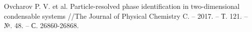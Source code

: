 \documentclass[pdf,hyperref={unicode}]{beamer}
\begin{document}
\begin{frame}
\begin{columns}
\begin{column}{0.4\linewidth}
{
\begin{figure}[h]
\end{figure}
}
\end{column}

\end{columns}

\vspace{15mm}
\tiny{
Ovcharov P. V. et al. Particle-resolved phase identification in two-dimensional condensable systems //The Journal of Physical Chemistry C. – 2017. – Т. 121. – №. 48. – С. 26860-26868.
}
\end{frame}
\end{document}
